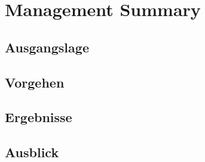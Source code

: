 \chapter{Management Summary}

\section{Ausgangslage}

\section{Vorgehen}

\section{Ergebnisse}

\section{Ausblick}